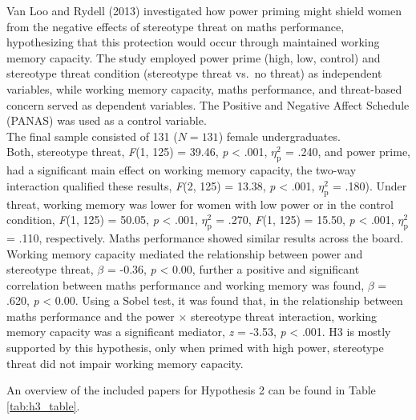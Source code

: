 \documentclass[
  stu, a4paper,floatsintext]{apa7}
\begin{document}
Van Loo and Rydell (2013) investigated how power priming might shield women from the negative effects of stereotype threat on maths performance, hypothesizing that this protection would occur through maintained working memory capacity.
The study employed power prime (high, low, control) and stereotype threat condition (stereotype threat vs.~no threat) as independent variables, while working memory capacity, maths performance, and threat-based concern served as dependent variables.
The Positive and Negative Affect Schedule (PANAS) was used as a control variable.\\
The final sample consisted of 131 (\(N = 131\)) female undergraduates.\\
Both, stereotype threat, \emph{F}(1, 125) = 39.46, \emph{p} \textless{} .001, \(\eta^{2}_{\text{p}}\) = .240, and power prime, had a significant main effect on working memory capacity, the two-way interaction qualified these results, \emph{F}(2, 125) = 13.38, \emph{p} \textless{} .001, \(\eta^{2}_{\text{p}}\) = .180).
Under threat, working memory was lower for women with low power or in the control condition, \emph{F}(1, 125) = 50.05, \emph{p} \textless{} .001, \(\eta^{2}_{\text{p}}\) = .270, \emph{F}(1, 125) = 15.50, \emph{p} \textless{} .001, \(\eta^{2}_{\text{p}}\) = .110, respectively.
Maths performance showed similar results across the board.
Working memory capacity mediated the relationship between power and stereotype threat, \(\beta\) = -0.36, \emph{p} \textless{} 0.00, further a positive and significant correlation between maths performance and working memory was found, \(\beta\) = .620, \emph{p} \textless{} 0.00.
Using a Sobel test, it was found that, in the relationship between maths performance and the power \(\times\) stereotype threat interaction, working memory capacity was a significant mediator, \emph{z} = -3.53, \emph{p} \textless{} .001.
H3 is mostly supported by this hypothesis, only when primed with high power, stereotype threat did not impair working memory capacity.

An overview of the included papers for Hypothesis 2 can be found in Table \ref{tab:h3_table}.
\end{document}
